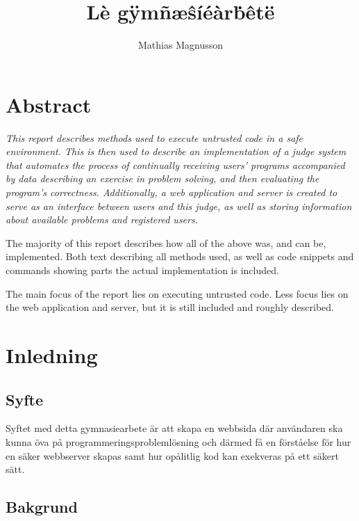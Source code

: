 \documentclass{article}
\author{Mathias Magnusson}
\title{Lè gÿmñæŝíéàrḃêtë}
\date{}
\begin{document}
\maketitle{}

\section*{Abstract}

\begin{par}

\itshape
This report describes methods used to execute untrusted code in a safe
environment. This is then used to describe an implementation of a judge system
that automates the process of continually receiving users' programs accompanied
by data describing an exercise in problem solving, and then evaluating the
program's correctness. Additionally, a web application and server is created to
serve as an interface between users and this judge, as well as storing
information about available problems and registered users.

The majority of this report describes how all of the above was, and can be,
implemented. Both text describing all methods used, as well as code snippets and
commands showing parts the actual implementation is included.

The main focus of the report lies on executing untrusted code. Less focus lies
on the web application and server, but it is still included and roughly
described.

\end{par}

\clearpage

\tableofcontents

\clearpage

\section{Inledning}

\subsection{Syfte}

Syftet med detta gymnasiearbete är att skapa en webbsida där användaren ska
kunna öva på programmeringsproblemlösning och därmed få en förståelse för hur
en säker webbserver skapas samt hur opålitlig kod kan exekveras på ett säkert
sätt.

\subsection{Bakgrund}
\end{document}
